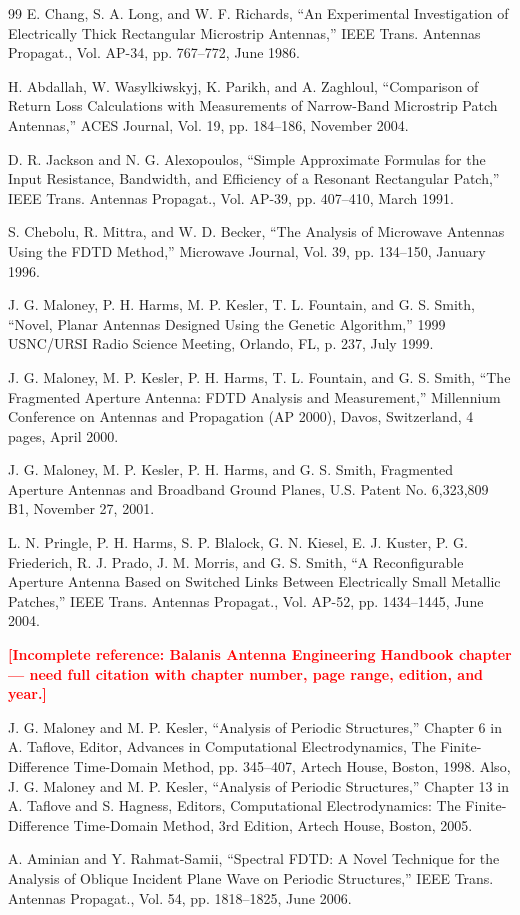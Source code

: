 \begin{thebibliography}{99}
 E. Chang, S. A. Long, and W. F. Richards, ``An Experimental Investigation of Electrically Thick Rectangular Microstrip Antennas,'' IEEE Trans. Antennas Propagat., Vol. AP-34, pp. 767--772, June 1986.

 H. Abdallah, W. Wasylkiwskyj, K. Parikh, and A. Zaghloul, ``Comparison of Return Loss Calculations with Measurements of Narrow-Band Microstrip Patch Antennas,'' ACES Journal, Vol. 19, pp. 184--186, November 2004.

 D. R. Jackson and N. G. Alexopoulos, ``Simple Approximate Formulas for the Input Resistance, Bandwidth, and Efficiency of a Resonant Rectangular Patch,'' IEEE Trans. Antennas Propagat., Vol. AP-39, pp. 407--410, March 1991.

 S. Chebolu, R. Mittra, and W. D. Becker, ``The Analysis of Microwave Antennas Using the FDTD Method,'' Microwave Journal, Vol. 39, pp. 134--150, January 1996.

 J. G. Maloney, P. H. Harms, M. P. Kesler, T. L. Fountain, and G. S. Smith, ``Novel, Planar Antennas Designed Using the Genetic Algorithm,'' 1999 USNC/URSI Radio Science Meeting, Orlando, FL, p. 237, July 1999.

 J. G. Maloney, M. P. Kesler, P. H. Harms, T. L. Fountain, and G. S. Smith, ``The Fragmented Aperture Antenna: FDTD Analysis and Measurement,'' Millennium Conference on Antennas and Propagation (AP 2000), Davos, Switzerland, 4 pages, April 2000.

 J. G. Maloney, M. P. Kesler, P. H. Harms, and G. S. Smith, Fragmented Aperture Antennas and Broadband Ground Planes, U.S. Patent No. 6,323,809 B1, November 27, 2001.

 L. N. Pringle, P. H. Harms, S. P. Blalock, G. N. Kiesel, E. J. Kuster, P. G. Friederich, R. J. Prado, J. M. Morris, and G. S. Smith, ``A Reconfigurable Aperture Antenna Based on Switched Links Between Electrically Small Metallic Patches,'' IEEE Trans. Antennas Propagat., Vol. AP-52, pp. 1434--1445, June 2004.

 \textcolor{red}{\textbf{[Incomplete reference: Balanis Antenna Engineering Handbook chapter --- need full citation with chapter number, page range, edition, and year.]}}

 J. G. Maloney and M. P. Kesler, ``Analysis of Periodic Structures,'' Chapter 6 in A. Taflove, Editor, Advances in Computational Electrodynamics, The Finite-Difference Time-Domain Method, pp. 345--407, Artech House, Boston, 1998. Also, J. G. Maloney and M. P. Kesler, ``Analysis of Periodic Structures,'' Chapter 13 in A. Taflove and S. Hagness, Editors, Computational Electrodynamics: The Finite-Difference Time-Domain Method, 3rd Edition, Artech House, Boston, 2005.

 A. Aminian and Y. Rahmat-Samii, ``Spectral FDTD: A Novel Technique for the Analysis of Oblique Incident Plane Wave on Periodic Structures,'' IEEE Trans. Antennas Propagat., Vol. 54, pp. 1818--1825, June 2006.

\end{thebibliography}
